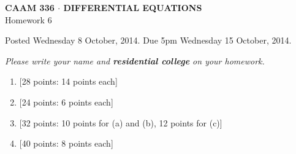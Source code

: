 \documentclass[10pt]{article}
\begin{document}
\vspace*{-5em}
\begin{center}
\large \textsf{\textbf{CAAM 336 $\cdot$ DIFFERENTIAL EQUATIONS}\\[0.5em]
Homework 6 }
\end{center}

Posted Wednesday 8 October, 2014.  Due 5pm Wednesday 15 October, 2014.
\begin{center}
\emph{Please write your name and \textbf{residential college} on your homework.}
\end{center}

\begin{enumerate}
\item {[28 points: 14 points each]}\\  
\newpage
\item {[24 points: 6 points each]}\\  
\newpage
\item {[32 points: 10 points for (a) and (b), 12 points for (c)]}\\  
\newpage
\item {[40 points: 8 points each]}\\  
%

\end{enumerate}
\end{document}
